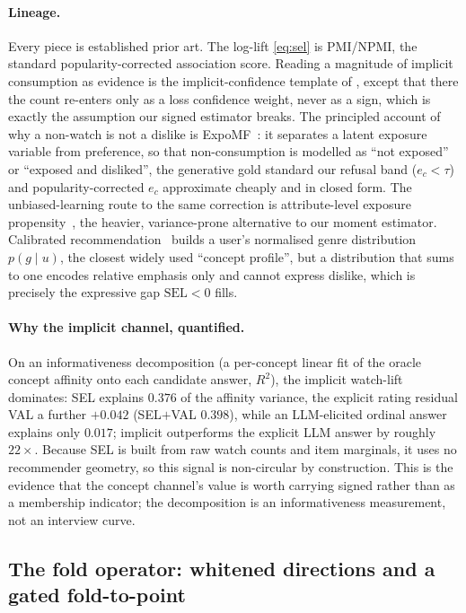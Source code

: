 \documentclass[manuscript,screen]{acmart}
\begin{document}
\paragraph{Lineage.} Every piece is established prior art. The log-lift \eqref{eq:sel} is PMI/NPMI, the standard popularity-corrected association score. Reading a magnitude of implicit consumption as evidence is the implicit-confidence template of \citet{hu2008collaborative}, except that there the count re-enters only as a loss confidence weight, never as a sign, which is exactly the assumption our signed estimator breaks. The principled account of why a non-watch is not a dislike is ExpoMF~\citep{liang2016expomf}: it separates a latent exposure variable from preference, so that non-consumption is modelled as ``not exposed'' or ``exposed and disliked'', the generative gold standard our refusal band ($e_c<\tau$) and popularity-corrected $e_c$ approximate cheaply and in closed form. The unbiased-learning route to the same correction is attribute-level exposure propensity~\citep{qin2020attributepropensity}, the heavier, variance-prone alternative to our moment estimator. Calibrated recommendation~\citep{steck2018calibrated} builds a user's normalised genre distribution $p(g\mid u)$, the closest widely used ``concept profile'', but a distribution that sums to one encodes relative emphasis only and cannot express dislike, which is precisely the expressive gap $\mathrm{SEL}<0$ fills.

\paragraph{Why the implicit channel, quantified.} On an informativeness decomposition (a per-concept linear fit of the oracle concept affinity onto each candidate answer, $R^2$), the implicit watch-lift dominates: SEL explains $0.376$ of the affinity variance, the explicit rating residual VAL a further $+0.042$ (SEL$+$VAL $0.398$), while an LLM-elicited ordinal answer explains only $0.017$; implicit outperforms the explicit LLM answer by roughly $22\times$. Because SEL is built from raw watch counts and item marginals, it uses no recommender geometry, so this signal is non-circular by construction. This is the evidence that the concept channel's value is worth carrying signed rather than as a membership indicator; the decomposition is an informativeness measurement, not an interview curve.

\subsection{The fold operator: whitened directions and a gated fold-to-point}\label{sec:concept:fold}
\end{document}
